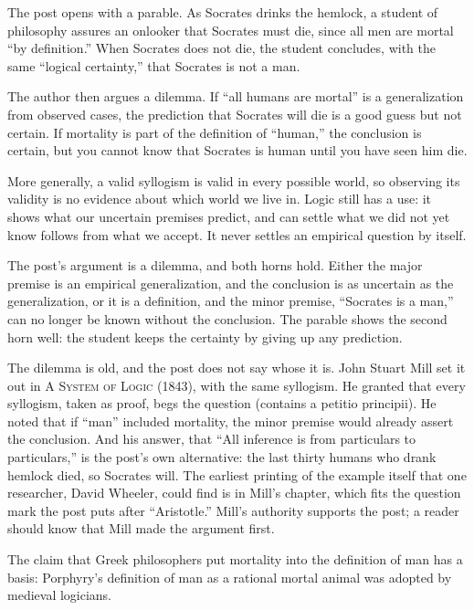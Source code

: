 \begin{afterword}
\summaryhead

The post opens with a parable. As Socrates drinks the hemlock, a student of philosophy assures an onlooker that Socrates must die, since all men are mortal ``by definition.'' When Socrates does not die, the student concludes, with the same ``logical certainty,'' that Socrates is not a man.

The author then argues a dilemma. If ``all humans are mortal'' is a generalization from observed cases, the prediction that Socrates will die is a good guess but not certain. If mortality is part of the definition of ``human,'' the conclusion is certain, but you cannot know that Socrates is human until you have seen him die.

More generally, a valid syllogism is valid in every possible world, so observing its validity is no evidence about which world we live in. Logic still has a use: it shows what our uncertain premises predict, and can settle what we did not yet know follows from what we accept. It never settles an empirical question by itself.

\responsehead

The post's argument is a dilemma, and both horns hold. Either the major premise is an empirical generalization, and the conclusion is as uncertain as the generalization, or it is a definition, and the minor premise, ``Socrates is a man,'' can no longer be known without the conclusion. The parable shows the second horn well: the student keeps the certainty by giving up any prediction.

The dilemma is old, and the post does not say whose it is. John Stuart Mill set it out in \textsc{A System of Logic} (1843), with the same syllogism. He granted that every syllogism, taken as proof, begs the question (contains a petitio principii). He noted that if ``man'' included mortality, the minor premise would already assert the conclusion. And his answer, that ``All inference is from particulars to particulars,'' is the post's own alternative: the last thirty humans who drank hemlock died, so Socrates will. The earliest printing of the example itself that one researcher, David Wheeler, could find is in Mill's chapter, which fits the question mark the post puts after ``Aristotle.'' Mill's authority supports the post; a reader should know that Mill made the argument first.

The claim that Greek philosophers put mortality into the definition of man has a basis: Porphyry's definition of man as a rational mortal animal was adopted by medieval logicians.


\end{afterword}
